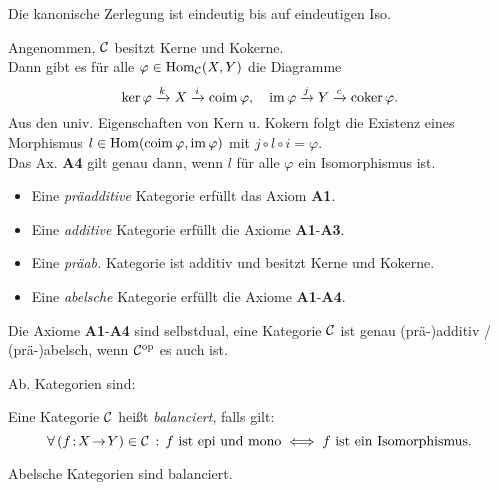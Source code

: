 \documentclass{cheat-sheet}
\DeclareMathOperator{\coker}{coker} %
\DeclareMathOperator{\coim}{coim} %
\begin{document}
\begin{bem}
  Die kanonische Zerlegung ist eindeutig bis auf eindeutigen Iso.
\end{bem}

\begin{bem}
  Angenommen, $\mathcal{C}$ besitzt Kerne und Kokerne. \\
  Dann gibt es für alle $\varphi \in \operatorname{Hom}_{\mathcal{C}}(X, Y)$ die Diagramme
  \[
    \ker \varphi \xrightarrow{k} X \xrightarrow{i} \coim \varphi, \quad
    \im \varphi \xrightarrow{j} Y \xrightarrow{c} \coker \varphi.
  \]
  Aus den univ. Eigenschaften von Kern u. Kokern folgt die Existenz eines Morphismus $l \in \Hom(\coim \varphi, \im \varphi)$ mit $j \circ l \circ i = \varphi$. \\
  Das Ax. \textbf{A4} gilt genau dann, wenn $l$ für alle $\varphi$ ein Isomorphismus ist.
\end{bem}


\begin{defn}
  \begin{itemize}
    \item Eine \emph{präadditive} Kategorie erfüllt das Axiom \textbf{A1}. \\
    \item Eine \emph{additive} Kategorie erfüllt die Axiome \textbf{A1}-\textbf{A3}. \\
    \item Eine \emph{präab.} Kategorie ist additiv und besitzt Kerne und Kokerne.
    \item Eine \emph{abelsche} Kategorie erfüllt die Axiome \textbf{A1}-\textbf{A4}.
  \end{itemize}
\end{defn}

\begin{bem}
  Die Axiome \textbf{A1}-\textbf{A4} sind selbstdual, \dh{} eine Kategorie $\mathcal{C}$ ist genau (prä-)additiv / (prä-)abelsch, wenn $\mathcal{C}^{\mathrm{op}}$ es auch ist.
\end{bem}

\begin{bspe}
  Ab. Kategorien sind: \enspace
  \inlineitem{$\AbGrp$,} \enspace
   \enspace
\end{bspe}

\begin{defn}
  Eine Kategorie $\mathcal{C}$ heißt \emph{balanciert}, falls gilt:
  \[
    \forall \, {(f \!:\! X \!\to\! Y) \in \mathcal{C}} \,:\,
    f \text{ ist epi und mono} \iff f \text{ ist ein Isomorphismus.}
  \]
\end{defn}

\begin{prop}
  Abelsche Kategorien sind balanciert.
\end{prop}


\end{document}
